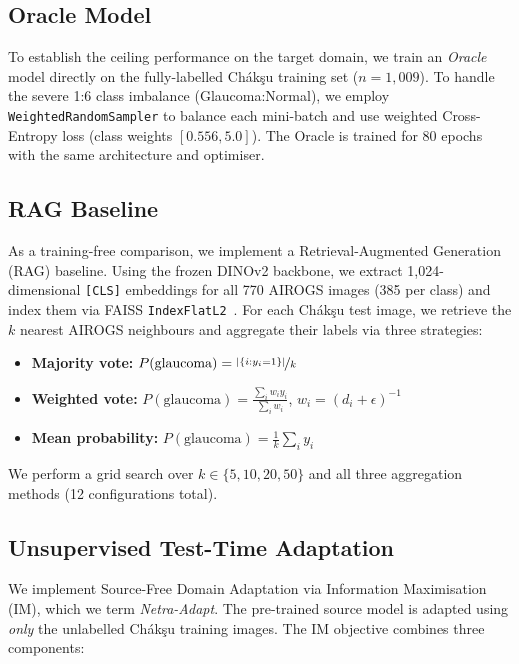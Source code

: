 \documentclass[11pt,twocolumn]{article}
\begin{document}
\subsection{Oracle Model}
\label{sec:oracle}

To establish the ceiling performance on the target domain, we train an \emph{Oracle} model directly on the fully-labelled Ch\'{a}k\c{s}u training set ($n{=}1{,}009$). To handle the severe 1:6 class imbalance (Glaucoma:Normal), we employ \texttt{WeightedRandomSampler} to balance each mini-batch and use weighted Cross-Entropy loss (class weights $[0.556, 5.0]$). The Oracle is trained for 80 epochs with the same architecture and optimiser.

\subsection{RAG Baseline}
\label{sec:rag}

As a training-free comparison, we implement a Retrieval-Augmented Generation (RAG) baseline. Using the frozen DINOv2 backbone, we extract 1,024-dimensional \texttt{[CLS]} embeddings for all 770 AIROGS images (385 per class) and index them via FAISS \texttt{IndexFlatL2}~\citep{johnson2019faiss}. For each Ch\'{a}k\c{s}u test image, we retrieve the $k$ nearest AIROGS neighbours and aggregate their labels via three strategies:

\begin{itemize}[leftmargin=*,itemsep=1pt]
    \item \textbf{Majority vote:} $P(\text{glaucoma}) = \nicefrac{|\{i : y_i = 1\}|}{k}$
    \item \textbf{Weighted vote:} $P(\text{glaucoma}) = \frac{\sum_i w_i y_i}{\sum_i w_i}$, $w_i = (d_i + \epsilon)^{-1}$
    \item \textbf{Mean probability:} $P(\text{glaucoma}) = \frac{1}{k}\sum_i y_i$
\end{itemize}

We perform a grid search over $k \in \{5, 10, 20, 50\}$ and all three aggregation methods (12 configurations total).

\subsection{Unsupervised Test-Time Adaptation}
\label{sec:tta}

We implement Source-Free Domain Adaptation via Information Maximisation (IM), which we term \emph{Netra-Adapt}. The pre-trained source model is adapted using \emph{only} the unlabelled Ch\'{a}k\c{s}u training images. The IM objective combines three components:
\end{document}
